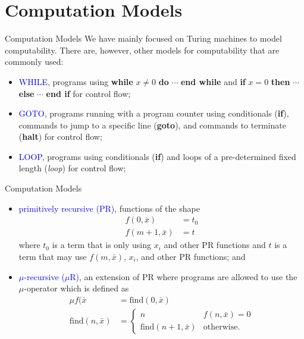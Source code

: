 \documentclass{beamer}
\theoremstyle{definition}
\def\b{\textcolor{blue}}
\begin{document}
\section{Computation Models}

\begin{frame}{Computation Models}
    We have mainly focused on Turing machines to model computability. There are, however, other models for computability that are commonly used:\pause
    \begin{itemize}
        \item \b{WHILE}, programs using \textbf{while} $x \neq 0$ \textbf{do} $\cdots$ \textbf{end while} and \textbf{if} $x = 0$ \textbf{then} $\cdots$ \textbf{else} $\cdots$ \textbf{end if} for control flow\pause;
        \item \b{GOTO}, programs running with a program counter using conditionals (\textbf{if}), commands to jump to a specific line (\textbf{goto}), and commands to terminate (\textbf{halt}) for control flow\pause;
        \item \b{LOOP}, programs using conditionals (\textbf{if}) and loops of a pre-determined fixed length (\textit{loop}) for control flow;
    \end{itemize}
\end{frame}

\begin{frame}{Computation Models}
    \begin{itemize}
        \item \b{primitively recursive (PR)}, functions of the shape \begin{align*}
            f(0,\bar{x}) &= t_0 \\
            f(m+1,\bar{x}) &= t
        \end{align*} where $t_0$ is a term that is only using $x_i$ and other PR functions and $t$ is a term that may use $f(m,\bar{x})$, $x_i$, and other PR functions\pause; and
        \item \b{$\mu$-recursive ($\mu$R)}, an extension of PR where programs are allowed to use the $\mu$-operator which is defined as \begin{align*}
            \mu f(\bar{x} &= \text{find}(0,\bar{x}) \\
            \text{find}(n,\bar{x}) &= \begin{cases}
                n & f(n,\bar{x}) = 0 \\
                \text{find}(n+1,\bar{x}) & \text{otherwise}.
            \end{cases}
        \end{align*}
    \end{itemize}
\end{frame}
\end{document}
